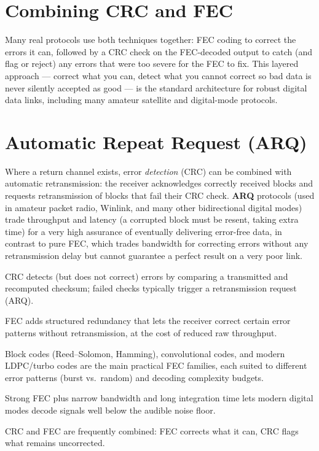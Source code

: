 \section{Combining CRC and FEC}

Many real protocols use both techniques together: FEC coding to correct
the errors it can, followed by a CRC check on the FEC-decoded output to
catch (and flag or reject) any errors that were too severe for the FEC
to fix. This layered approach --- correct what you can, detect what you
cannot correct so bad data is never silently accepted as good --- is the
standard architecture for robust digital data links, including many
amateur satellite and digital-mode protocols.

\section{Automatic Repeat Request (ARQ)}

Where a return channel exists, error \emph{detection} (CRC) can be
combined with automatic retransmission: the receiver acknowledges
correctly received blocks and requests retransmission of blocks that
fail their CRC check. \textbf{ARQ} protocols (used in amateur packet
radio, Winlink, and many other bidirectional digital modes) trade
throughput and latency (a corrupted block must be resent, taking extra
time) for a very high assurance of eventually delivering error-free
data, in contrast to pure FEC, which trades bandwidth for correcting
errors without any retransmission delay but cannot guarantee a
perfect result on a very poor link.

\begin{quickreview}
\item CRC detects (but does not correct) errors by comparing a
transmitted and recomputed checksum; failed checks typically trigger a
retransmission request (ARQ).
\item FEC adds structured redundancy that lets the receiver correct
certain error patterns without retransmission, at the cost of reduced
raw throughput.
\item Block codes (Reed--Solomon, Hamming), convolutional codes, and
modern LDPC/turbo codes are the main practical FEC families, each suited
to different error patterns (burst vs.\ random) and decoding complexity
budgets.
\item Strong FEC plus narrow bandwidth and long integration time lets
modern digital modes decode signals well below the audible noise floor.
\item CRC and FEC are frequently combined: FEC corrects what it can,
CRC flags what remains uncorrected.
\end{quickreview}


